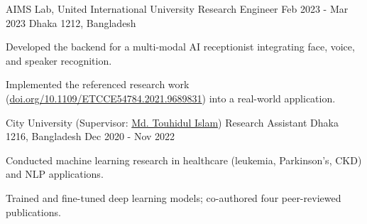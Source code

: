 \begin{cventries}


\cventry
  {AIMS Lab, United International University} %
  {Research Engineer} %
  {Feb 2023 - Mar 2023} %
  {Dhaka 1212, Bangladesh} %
{
  \begin{cvitems}
    \item{Developed the backend for a multi-modal AI receptionist integrating face, voice, and speaker recognition.}
    \item{Implemented the referenced research work (\href{https://doi.org/10.1109/ETCCE54784.2021.9689831}{doi.org/10.1109/ETCCE54784.2021.9689831}) into a real-world application.}
  \end{cvitems}
}




\cventry
  {City University (Supervisor: \href{https://www.linkedin.com/in/touhid000/}{Md. Touhidul Islam})} %
  {Research Assistant} %
  {Dhaka 1216, Bangladesh} %
  {Dec 2020 - Nov 2022} %
  {
    \begin{cvitems} %
      \item {Conducted machine learning research in healthcare (leukemia, Parkinson’s, CKD) and NLP applications.}
      \item{Trained and fine-tuned deep learning models; co-authored four peer-reviewed publications.}
    \end{cvitems}
  }
  

\end{cventries}
